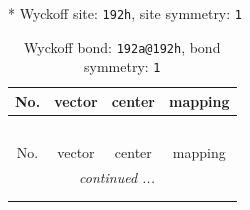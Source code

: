 \documentclass[fleqn,8pt]{jsarticle}
\begin{document}
* Wyckoff site: {\tt 192h}, site symmetry: {\tt 1}
\renewcommand{\arraystretch}{1.2}
\begin{longtable}{cccc}
\caption{Wyckoff bond: {\tt 192a@192h}, bond symmetry: {\tt 1}}
 \\
 \hline \hline
No. & vector & center & mapping \\ \hline \endfirsthead

\multicolumn{3}{l}{\tablename\ \thetable{}} \\
 \hline \hline
No. & vector & center & mapping \\ \hline \endhead

 \hline \hline
\multicolumn{3}{r}{\footnotesize\it continued ...} \\ \endfoot

 \hline \hline
\multicolumn{3}{r}{} \\ \endlastfoot


\end{longtable}
\end{document}

